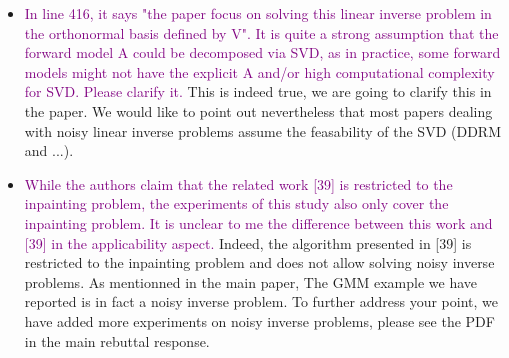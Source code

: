 \documentclass{article}
\newcommand{\question}[1]{\textcolor{purple}{#1}}
\begin{document}
\begin{itemize}
    \item \question{In line 416, it says "the paper focus on solving this linear inverse problem in the orthonormal basis defined by V". It is quite a strong assumption that the forward model A could be decomposed via SVD, as in practice, some forward models might not have the explicit A and/or high computational complexity for SVD. Please clarify it.} This is indeed true, we are going to clarify this in the paper. We would like to point out nevertheless that most papers dealing with noisy linear inverse problems assume the feasability of the SVD (DDRM and ...).
    \item \question{While the authors claim that the related work [39] is restricted to the inpainting problem, the experiments of this study also only cover the inpainting problem. It is unclear to me the difference between this work and [39] in the applicability aspect.} Indeed, the algorithm presented in [39] is restricted to the inpainting problem and does not allow solving noisy inverse problems. As mentionned in the main paper, The GMM example we have reported  is in fact a noisy inverse problem. To further address your point, we have added more experiments on noisy inverse problems, please see the PDF in the main rebuttal response. 
\end{itemize}
\end{document}
